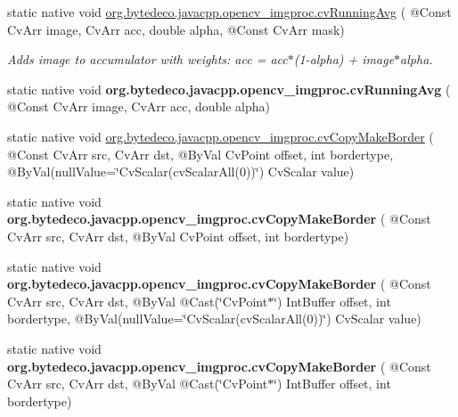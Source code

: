 \begin{DoxyCompactItemize}
\item 
static native void \hyperlink{group__imgproc__c_gaf06fc48b42683511a2fc75d1fe34b2e8}{org.\+bytedeco.\+javacpp.\+opencv\+\_\+imgproc.\+cv\+Running\+Avg} ( @Const Cv\+Arr image, Cv\+Arr acc, double alpha, @Const Cv\+Arr mask)
\begin{DoxyCompactList}\small\item\em Adds image to accumulator with weights\+: acc = acc$\ast$(1-\/alpha) + image$\ast$alpha. \end{DoxyCompactList}\item 
\mbox{\label{group__imgproc__c_gaab6cdf4dc3ff277c6595ed819fc63ff9}} 
static native void {\bfseries org.\+bytedeco.\+javacpp.\+opencv\+\_\+imgproc.\+cv\+Running\+Avg} ( @Const Cv\+Arr image, Cv\+Arr acc, double alpha)
\item 
static native void \hyperlink{group__imgproc__c_ga46ab19adc04378f8728b90f45240f5da}{org.\+bytedeco.\+javacpp.\+opencv\+\_\+imgproc.\+cv\+Copy\+Make\+Border} ( @Const Cv\+Arr src, Cv\+Arr dst, @By\+Val Cv\+Point offset, int bordertype, @By\+Val(null\+Value=\char`\"{}Cv\+Scalar(cv\+Scalar\+All(0))\char`\"{}) Cv\+Scalar value)
\item 
\mbox{\label{group__imgproc__c_gaca27fb0b9051c3c1cf968c809e1778de}} 
static native void {\bfseries org.\+bytedeco.\+javacpp.\+opencv\+\_\+imgproc.\+cv\+Copy\+Make\+Border} ( @Const Cv\+Arr src, Cv\+Arr dst, @By\+Val Cv\+Point offset, int bordertype)
\item 
\mbox{\label{group__imgproc__c_gafd7c5d632e51cf1e80f518dc37cee41f}} 
static native void {\bfseries org.\+bytedeco.\+javacpp.\+opencv\+\_\+imgproc.\+cv\+Copy\+Make\+Border} ( @Const Cv\+Arr src, Cv\+Arr dst, @By\+Val @Cast(\char`\"{}Cv\+Point$\ast$\char`\"{}) Int\+Buffer offset, int bordertype, @By\+Val(null\+Value=\char`\"{}Cv\+Scalar(cv\+Scalar\+All(0))\char`\"{}) Cv\+Scalar value)
\item 
\mbox{\label{group__imgproc__c_gac620224b5625099957b53c0df9a09744}} 
static native void {\bfseries org.\+bytedeco.\+javacpp.\+opencv\+\_\+imgproc.\+cv\+Copy\+Make\+Border} ( @Const Cv\+Arr src, Cv\+Arr dst, @By\+Val @Cast(\char`\"{}Cv\+Point$\ast$\char`\"{}) Int\+Buffer offset, int bordertype)
\item 
\mbox{\label{group__imgproc__c_gabb593ab2191f24286ad60f804a3accc9}} 

\end{DoxyCompactItemize}
